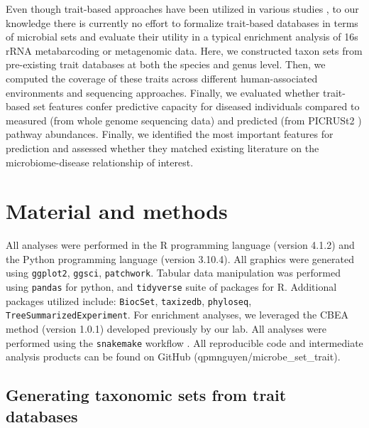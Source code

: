 \documentclass{bmcart}
\begin{document}
Even though trait-based approaches have been utilized in various studies \cite{weissman2021exploring, bewick2019traitbased, guittar2019traitbased, krause2014traitbased}, to our knowledge there is currently no effort to formalize trait-based databases in terms of microbial sets and evaluate their utility in a typical enrichment analysis of 16s rRNA metabarcoding or metagenomic data. Here, we constructed taxon sets from pre-existing trait databases at both the species and genus level. Then, we computed the coverage of these traits across different human-associated environments and sequencing approaches. Finally, we evaluated whether trait-based set features confer predictive capacity for diseased individuals compared to measured (from whole genome sequencing data) and predicted (from PICRUSt2 \cite{douglas2020picrust2}) pathway abundances. Finally, we identified the most important features for prediction and assessed whether they matched existing literature on the microbiome-disease relationship of interest.    

\section*{Material and methods} \label{methods}

All analyses were performed in the R programming language (version 4.1.2) \cite{rcoreteam2021language} and the Python programming language (version 3.10.4). All graphics were generated using \texttt{ggplot2}, \texttt{ggsci}, \texttt{patchwork}. Tabular data manipulation was performed using \texttt{pandas} for python, and \texttt{tidyverse} suite of packages for R. Additional packages utilized include: \texttt{BiocSet}, \texttt{taxizedb}, \texttt{phyloseq}, \texttt{TreeSummarizedExperiment}. For enrichment analyses, we leveraged the CBEA \cite{nguyen2022cbea} method (version 1.0.1) developed previously by our lab. All analyses were performed using the \texttt{snakemake} workflow \cite{molder2021sustainable}. All reproducible code and intermediate analysis products can be found on GitHub (qpmnguyen/microbe\_set\_trait).  

\subsection*{Generating taxonomic sets from trait databases}  
\end{document}
